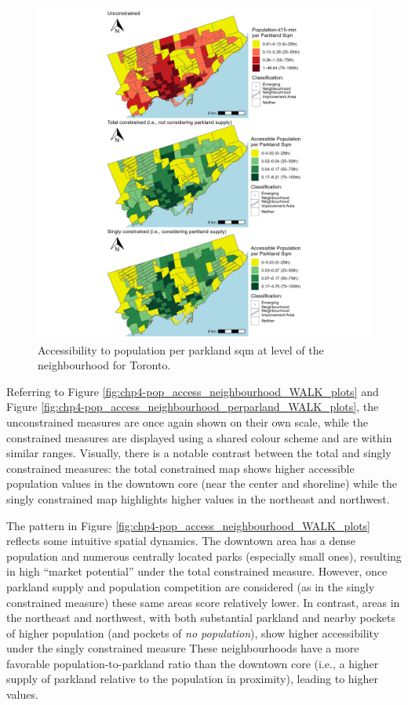\documentclass[
11pt, %
oneside, %
english, %
singlespacing, %
]{macthesis} %
\begin{document}
\begin{figure}

{\centering \includegraphics[width=6in]{./data/figures/chp4-pop_access_neighbourhood_perparland_WALK_plots} 

}

\caption{\label{fig:chp4-pop_access_neighbourhood_perparland_WALK_plots} Accessibility to population per parkland sqm at level of the neighbourhood for Toronto.}\label{fig:unnamed-chunk-70}
\end{figure}

Referring to Figure \ref{fig:chp4-pop_access_neighbourhood_WALK_plots} and Figure \ref{fig:chp4-pop_access_neighbourhood_perparland_WALK_plots}, the unconstrained measures are once again shown on their own scale, while the constrained measures are displayed using a shared colour scheme and are within similar ranges. Visually, there is a notable contrast between the total and singly constrained measures: the total constrained map shows higher accessible population values in the downtown core (near the center and shoreline) while the singly constrained map highlights higher values in the northeast and northwest.

The pattern in Figure \ref{fig:chp4-pop_access_neighbourhood_WALK_plots} reflects some intuitive spatial dynamics. The downtown area has a dense population and numerous centrally located parks (especially small ones), resulting in high ``market potential'' under the total constrained measure. However, once parkland supply and population competition are considered (as in the singly constrained measure) these same areas score relatively lower. In contrast, areas in the northeast and northwest, with both substantial parkland and nearby pockets of higher population (and pockets of \emph{no population}), show higher accessibility under the singly constrained measure These neighbourhoods have a more favorable population-to-parkland ratio than the downtown core (i.e., a higher supply of parkland relative to the population in proximity), leading to higher values.
\end{document}

